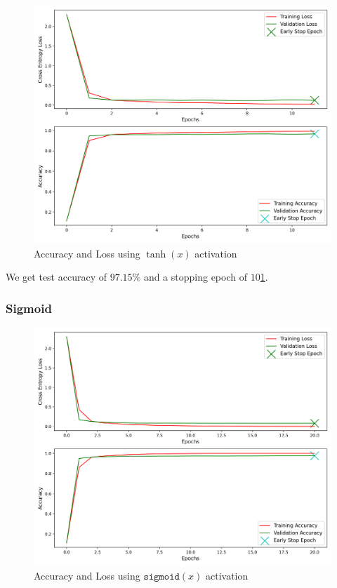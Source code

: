 \begin{figure}[!ht]
	\centering
	\includegraphics[width=1.0\textwidth]{./images/activation_tanh.png}
	\caption{Accuracy and Loss using $\tanh(x)$ activation}
	\label{fig:tanh}
\end{figure}

We get test accuracy of $97.15\%$ and a stopping epoch of $10$\cref{fig:tanh}.

\subsubsection{Sigmoid}


\begin{figure}[!ht]
	\centering
	\includegraphics[width=1.0\textwidth]{./images/activation_sigmoid.png}
	\caption{Accuracy and Loss using $\texttt{sigmoid}(x)$ activation}
	\label{fig:sigmoid}
\end{figure}

